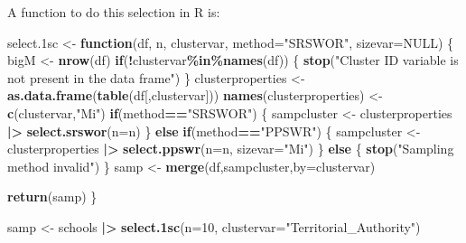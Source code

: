 \documentclass[
]{book}
\newenvironment{Shaded}{\begin{snugshade}}{\end{snugshade}}
\newcommand{\AttributeTok}[1]{\textcolor[rgb]{0.13,0.29,0.53}{#1}}
\newcommand{\ConstantTok}[1]{\textcolor[rgb]{0.56,0.35,0.01}{#1}}
\newcommand{\ControlFlowTok}[1]{\textcolor[rgb]{0.13,0.29,0.53}{\textbf{#1}}}
\newcommand{\DecValTok}[1]{\textcolor[rgb]{0.00,0.00,0.81}{#1}}
\newcommand{\FloatTok}[1]{\textcolor[rgb]{0.00,0.00,0.81}{#1}}
\newcommand{\FunctionTok}[1]{\textcolor[rgb]{0.13,0.29,0.53}{\textbf{#1}}}
\newcommand{\NormalTok}[1]{#1}
\newcommand{\OtherTok}[1]{\textcolor[rgb]{0.56,0.35,0.01}{#1}}
\newcommand{\SpecialCharTok}[1]{\textcolor[rgb]{0.81,0.36,0.00}{\textbf{#1}}}
\newcommand{\StringTok}[1]{\textcolor[rgb]{0.31,0.60,0.02}{#1}}
\begin{document}
A function to do this selection in R is:

\begin{Shaded}
\begin{Highlighting}[]
\NormalTok{select}\FloatTok{.1}\NormalTok{sc }\OtherTok{\textless{}{-}} \ControlFlowTok{function}\NormalTok{(df, n, clustervar, }
                       \AttributeTok{method=}\StringTok{"SRSWOR"}\NormalTok{, }\AttributeTok{sizevar=}\ConstantTok{NULL}\NormalTok{) \{}
\NormalTok{  bigM }\OtherTok{\textless{}{-}} \FunctionTok{nrow}\NormalTok{(df)}
  \ControlFlowTok{if}\NormalTok{(}\SpecialCharTok{!}\NormalTok{clustervar}\SpecialCharTok{\%in\%}\FunctionTok{names}\NormalTok{(df)) \{}
    \FunctionTok{stop}\NormalTok{(}\StringTok{"Cluster ID variable is not present in the data frame"}\NormalTok{)}
\NormalTok{  \}}
\NormalTok{  clusterproperties }\OtherTok{\textless{}{-}} \FunctionTok{as.data.frame}\NormalTok{(}\FunctionTok{table}\NormalTok{(df[,clustervar]))}
  \FunctionTok{names}\NormalTok{(clusterproperties) }\OtherTok{\textless{}{-}} \FunctionTok{c}\NormalTok{(clustervar,}\StringTok{"Mi"}\NormalTok{)}
  \ControlFlowTok{if}\NormalTok{(method}\SpecialCharTok{==}\StringTok{"SRSWOR"}\NormalTok{) \{}
\NormalTok{     sampcluster }\OtherTok{\textless{}{-}}\NormalTok{ clusterproperties }\SpecialCharTok{|\textgreater{}} 
                       \FunctionTok{select.srswor}\NormalTok{(}\AttributeTok{n=}\NormalTok{n)}
\NormalTok{  \} }\ControlFlowTok{else} \ControlFlowTok{if}\NormalTok{(method}\SpecialCharTok{==}\StringTok{"PPSWR"}\NormalTok{) \{}
\NormalTok{     sampcluster }\OtherTok{\textless{}{-}}\NormalTok{ clusterproperties }\SpecialCharTok{|\textgreater{}}
                       \FunctionTok{select.ppswr}\NormalTok{(}\AttributeTok{n=}\NormalTok{n, }\AttributeTok{sizevar=}\StringTok{"Mi"}\NormalTok{)}
\NormalTok{  \} }\ControlFlowTok{else}\NormalTok{ \{}
    \FunctionTok{stop}\NormalTok{(}\StringTok{"Sampling method invalid"}\NormalTok{)}
\NormalTok{  \}}
\NormalTok{  samp }\OtherTok{\textless{}{-}} \FunctionTok{merge}\NormalTok{(df,sampcluster,}\AttributeTok{by=}\NormalTok{clustervar)}

  \FunctionTok{return}\NormalTok{(samp)}
\NormalTok{\}}
\end{Highlighting}
\end{Shaded}

\begin{Shaded}
\begin{Highlighting}[]
\NormalTok{samp }\OtherTok{\textless{}{-}}\NormalTok{ schools }\SpecialCharTok{|\textgreater{}} \FunctionTok{select.1sc}\NormalTok{(}\AttributeTok{n=}\DecValTok{10}\NormalTok{, }\AttributeTok{clustervar=}\StringTok{"Territorial\_Authority"}\NormalTok{)}
\end{Highlighting}
\end{Shaded}
\end{document}
